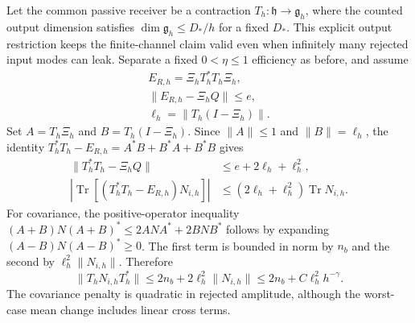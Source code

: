 \documentclass[aps,pra,reprint,superscriptaddress,longbibliography]{revtex4-2}
\newcommand{\Tr}{\operatorname{Tr}}
\begin{document}
Let the common passive receiver be a contraction
$T_h:\mathfrak h\to\mathfrak g_h$, where the counted output dimension
satisfies $\dim\mathfrak g_h\le D_*/h$ for a fixed $D_*$.  This explicit
output restriction keeps the finite-channel claim valid even when
infinitely many rejected input modes can leak.  Separate a fixed
$0<\eta\le1$ efficiency as before, and assume
\begin{equation}
\begin{gathered}
 E_{R,h}=\Xi_hT_h^*T_h\Xi_h,\\
 \|E_{R,h}-\Xi_hQ\|\le e,
 \\
 \ell_h=\|T_h(I-\Xi_h)\|.
 \label{sgt:bose:leakage-hypothesis}
\end{gathered}
\end{equation}
Set $A=T_h\Xi_h$ and $B=T_h(I-\Xi_h)$.  Since $\|A\|\le1$ and
$\|B\|=\ell_h$, the identity
$T_h^*T_h-E_{R,h}=A^*B+B^*A+B^*B$ gives
\begin{align}
 \|T_h^*T_h-\Xi_hQ\|&\le e+2\ell_h+\ell_h^2,\nonumber\\
 |\Tr[(T_h^*T_h-E_{R,h})N_{i,h}]|
    &\le(2\ell_h+\ell_h^2)\Tr N_{i,h}.
 \label{sgt:bose:leakage-mean}
\end{align}
For covariance, the positive-operator inequality
$(A+B)N(A+B)^*\le2ANA^*+2BNB^*$ follows by expanding
$(A-B)N(A-B)^*\ge0$.  The first term is bounded in norm by $n_b$
and the second by $\ell_h^2\|N_{i,h}\|$.  Therefore
\begin{equation}
 \|T_hN_{i,h}T_h^*\|
    \le2n_b+2\ell_h^2\|N_{i,h}\|
    \le2n_b+C\ell_h^2h^{-\gamma}.
 \label{sgt:bose:leakage-covariance}
\end{equation}
The covariance penalty is quadratic in rejected amplitude, although
the worst-case mean change includes linear cross terms.
\end{document}
